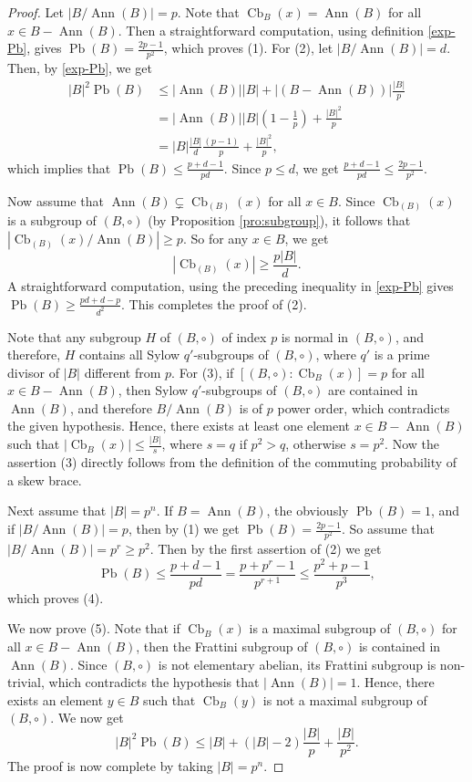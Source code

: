 \documentclass[oneside]{amsart}
\numberwithin{equation}{section}
\theoremstyle{plain}
\theoremstyle{definition}
\newcommand{\Cb}{\operatorname{Cb} }
\newcommand{\Pb}{\operatorname{Pb} }
\newcommand{\Ann}{\operatorname{Ann} }
\begin{document}
\begin{proof}
Let $|B/\Ann(B)| = p$. Note that $\Cb_B(x) = \Ann(B)$ for all $x \in B - \Ann(B)$. Then a straightforward computation, using definition  \eqref{exp-Pb}, gives 
$\Pb(B)=\frac{2p-1}{p^2}$, which proves (1). For (2), let $|B/\Ann(B)| = d$. Then, by  \eqref{exp-Pb}, we get
      \begin{align*}
            |B|^2\Pb(B)&\leqslant |\Ann(B)||B|+|(B-\Ann(B))|\frac{|B|}{p}\\
                        &=|\Ann(B)||B|(1-\frac{1}{p}) + \frac{|B|^2}{p}\\
                        &=|B|\frac{|B|}{d}\frac{(p-1)}{p} +\frac{|B|^2}{p},
      \end{align*}
      which implies that $\Pb(B)\leqslant \frac{p+d-1}{pd}$. Since $p \leqslant d$, we get $\frac{p+d-1}{pd} \leqslant \frac{2p-1}{p^2}$.
      
    Now assume that   $\Ann(B) \subsetneq \Cb_{(B)}(x)$ for all $x\in B$.
    Since $\Cb_{(B)}(x)$ is a subgroup of $(B,\circ)$ (by Proposition \ref{pro:subgroup}), it follows that $|\Cb_{(B)}(x)/\Ann(B)| \geqslant p$.  So for any $x\in B$, we get 
      $$|\Cb_{(B)}(x)|\geqslant \frac{p|B|}{d}.$$
A straightforward computation, using the preceding inequality in \eqref{exp-Pb} gives 
 $\Pb(B)\geqslant \frac{pd+d-p}{d^2}$.  This completes the proof of (2).
 
Note that any subgroup $H$ of $(B, \circ)$ of index $p$ is normal in $(B, \circ)$, and therefore, $H$ contains all Sylow $q'$-subgroups of $(B, \circ)$, where $q'$ is a prime divisor of $|B|$ different from $p$.   For (3), if $[(B, \circ) : \Cb_B(x)] = p$ for all $x \in B - \Ann(B)$, then Sylow $q'$-subgroups   of $(B, \circ)$ are contained in $\Ann(B)$, and therefore $B/\Ann(B)$ is of $p$ power order, which contradicts the  given hypothesis. Hence,  there exists at least one element $x \in B - \Ann(B)$ such that $|\Cb_B(x)| \le  \frac{|B|}{s}$, where $s = q$ if $p^2 > q$, otherwise $s = p^2$. Now the assertion (3) directly follows from the definition of the commuting probability of a skew brace.
 
 Next assume that $|B| = p^n$. If $B = \Ann(B)$, the obviously $\Pb(B) =1$, and if $|B/\Ann(B)| = p$, then by (1) we get $\Pb(B) = \frac{2p-1}{p^2}$. So assume that $|B/\Ann(B)| = p^r \geqslant p^2$.  Then by the first assertion of (2) we get
 $$\Pb(B)\leqslant \frac{p+d-1}{pd} =  \frac{p+p^r-1}{p^{r+1}}  \leqslant \frac{p^2+p-1}{p^3},$$
 which proves (4).
 
We now prove (5).  Note that if $\Cb_B(x)$ is a maximal subgroup of $(B, \circ)$ for all $x \in B - \Ann(B)$, then the Frattini subgroup of $(B, \circ)$ is contained in $\Ann(B)$. Since  $(B, \circ)$ is not elementary abelian, its Frattini subgroup is non-trivial, which contradicts the hypothesis that  $|\Ann(B)| = 1$. Hence, there exists an element $y \in B$ such that $\Cb_B(y)$ is not a maximal subgroup of $(B, \circ)$. We now get 
$$ |B|^2\Pb(B)\leqslant |B|+(|B|-2) \frac{|B|}{p} +  \frac{|B|}{p^2}.$$
 The  proof is now complete by taking $|B| = p^n$.
 \end{proof}
 
\end{document}
